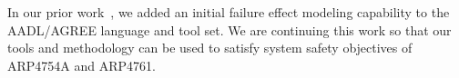 
In our prior work~\cite{Stewart17:IMBSA}, we added an initial failure effect modeling capability to the AADL/AGREE language and tool set.  We are continuing this work so that our tools and methodology can be used to satisfy system safety objectives of ARP4754A and ARP4761.  

\begin{comment}
In particular, our goals are to:

\begin{itemize}
	\item Provide a comprehensive, qualitative description of the causal relationship between basic failure events and system level safety requirements.
	\item Provide an accurate, quantitative description of the contribution relationship between failure rates of the fault tree basic events and numerical probability requirements at the system level.
\end{itemize}
\end{comment}



